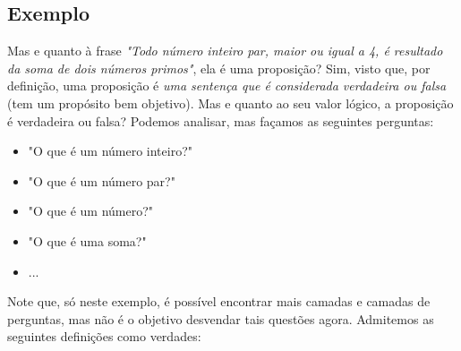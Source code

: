 \documentclass[13pt,letterpaper]{article}
\begin{document}
\subsection{Exemplo}
Mas e quanto à frase \emph{"Todo número inteiro par, maior ou igual a 4, é resultado da soma de dois números primos"}, ela é uma proposição? Sim, visto que, por definição, uma proposição é \emph{uma sentença que é considerada verdadeira ou falsa} (tem um propósito bem objetivo). Mas e quanto ao seu valor lógico, a proposição é verdadeira ou falsa? Podemos analisar, mas façamos as seguintes perguntas:
\begin{itemize}
    \item "O que é um número inteiro?"
    \item "O que é um número par?"
    \item "O que é um número?"
    \item "O que é uma soma?"
    \item ...
\end{itemize}
Note que, só neste exemplo, é possível encontrar mais camadas e camadas de perguntas, mas não é o objetivo desvendar tais questões agora. Admitemos as seguintes definições como verdades:
\end{document}
